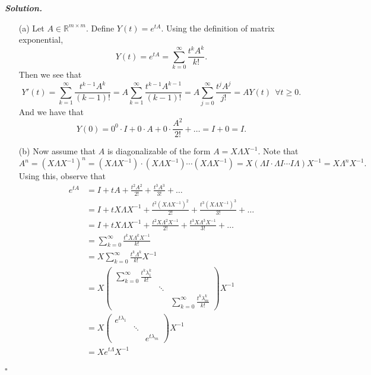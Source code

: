 \documentclass[12pt]{report}
\newenvironment{solution}[1][\it{Solution}]{\textbf{#1. } }{$\square$}
\def\R{{\mathbb R}}
\newcommand{\paren}[1]{{\left(#1\right)}} %
\begin{document}
\begin{solution}

    \noindent
    \begin{enumerate}
        \item [(a)]
        Let $A \in \R^{m \times m}$. Define $Y(t) = e^{tA}$. Using the definition of matrix exponential,
        \[ Y(t) = e^{tA} = \sum_{k=0}^{\infty} \frac{t^kA^k}{k!}.\]
        Then we see that
        \[
            Y'(t) = \sum_{k=1}^{\infty} \frac{t^{k-1}A^{k}}{(k-1)!} = A\sum_{k=1}^{\infty} \frac{t^{k-1}A^{k-1}}{(k-1)!} = A\sum_{j=0}^{\infty} \frac{t^{j}A^{j}}{j!} = AY(t) ~~ \forall t \geq 0. 
        \]
        And we have that
        \[ 
            Y(0) = 0^0\cdot I + 0\cdot A + 0 \cdot \frac{A^2}{2!} + \ldots = I + 0 = I.
        \]

        \item [(b)]
        Now assume that $A$ is diagonalizable of the form $A  = X\Lambda X^{-1}.$ Note that
        \[ 
          A^{n} = \paren{X\Lambda X^{-1}}^n = \paren{X\Lambda X^{-1}}\cdot \paren{X\Lambda X^{-1}}\cdots\paren{X\Lambda X^{-1}} = X\paren{\Lambda I\cdot \Lambda I\cdots I\Lambda} X^{-1} = X\Lambda^nX^{-1}. 
        \]
        Using this, observe that
        \begin{align*}
            e^{tA} &= I + tA + \frac{t^2A^2}{2!} + \frac{t^3A^3}{3!} + \ldots\\
            &= I + tX\Lambda X^{-1} + \frac{t^2\paren{X\Lambda X^{-1}}^2}{2!} + \frac{t^3\paren{X\Lambda X^{-1}}^3}{3!} + \ldots\\
            &= I + tX\Lambda X^{-1} + \frac{t^2X\Lambda^2 X^{-1}}{2!} + \frac{t^3X\Lambda^3 X^{-1}}{3!} + \ldots\\
            &= \sum_{k=0}^{\infty} \frac{t^k X \Lambda^k X^{-1}}{k!}\\
            &= X\sum_{k=0}^{\infty} \frac{t^k \Lambda^k}{k!}X^{-1}\\
            &= X \begin{pmatrix}
                \sum_{k=0}^{\infty} \frac{t^k \lambda_1^k}{k!}&&\\
               &\ddots&\\
               &&\sum_{k=0}^{\infty} \frac{t^k \lambda_m^k}{k!} 
            \end{pmatrix} X^{-1}\\
            &= X \begin{pmatrix}
                e^{t\lambda_1} & & \\
                & \ddots &\\
                & & e^{t\lambda_m}
            \end{pmatrix} X^{-1}\\
            &= X e^{t\Lambda}X^{-1}\\
        \end{align*}
    \end{enumerate}
\end{solution}
\end{document}
